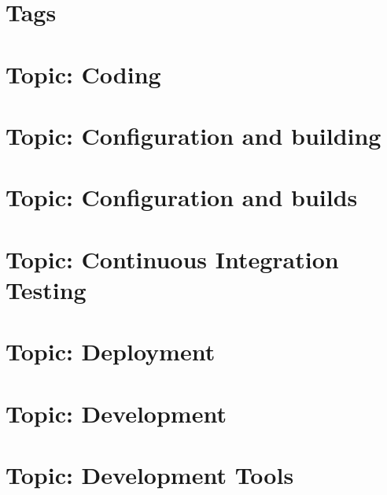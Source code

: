 \documentclass[twoside]{book}
\newcommand{\+}{\discretionary{\mbox{\scriptsize$\hookleftarrow$}}{}{}}
\begin{document}
\chapter{Tags}
\label{md_markdown_tags}

\chapter{Topic\+: Coding}
\label{md_markdown_topic_coding}

\chapter{Topic\+: Configuration and building}
\label{md_markdown_topic_configuration_and_building}

\chapter{Topic\+: Configuration and builds}
\label{md_markdown_topic_configuration_and_builds}

\chapter{Topic\+: Continuous Integration Testing}
\label{md_markdown_topic_continuous_integration_testing}

\chapter{Topic\+: Deployment}
\label{md_markdown_topic_deployment}

\chapter{Topic\+: Development}
\label{md_markdown_topic_development}

\chapter{Topic\+: Development Tools}
\label{md_markdown_topic_development_tools}

\end{document}
